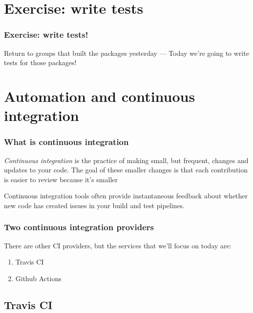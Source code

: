\documentclass[10pt]{beamer}
\begin{document}
\section{Exercise: write tests}

  \begin{frame} \frametitle{Exercise: write tests!}

    Return to groups that built the packages yesterday --- Today we're going to write
    tests for those packages!

  \end{frame}

\section{Automation and continuous integration}

  \begin{frame} \frametitle{What is continuous integration}

    \textit{Continuous integration} is the practice of making small, but frequent,
    changes and updates to your code. The goal of these smaller changes is that each
    contribution is easier to review because it's smaller

    \vspace{0.25cm}

    Continuous integration tools often provide instantaneous feedback about whether new
    code has created issues in your build and test pipelines.

  \end{frame}

  \begin{frame} \frametitle{Two continuous integration providers}

    There are other CI providers, but the services that we'll focus on today are:

    \begin{enumerate}
      \item Travis CI
      \item Github Actions
    \end{enumerate}

  \end{frame}


  \subsection{Travis CI}
\end{document}
